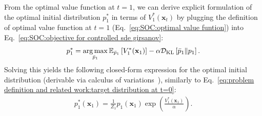 From the optimal value function at $t=1$, we can derive explicit formulation of the optimal initial distribution $p_1^*$ in terms of $V_1^*(\mathbf{x}_t)$ by plugging the definition of optimal value function at $t=1$ (Eq.~\ref{eq:SOC:optimal value funtion}) into Eq.~\ref{eq:SOC:objective for controlled sde girsanov}:
\begin{align}
    p_1^*=\operatorname*{arg\,max}_{\bar{p}_1} \mathbb{E}_{\bar{p}_1}\left[ V_1^*(\mathbf{x}_1) \right]-\alpha \mathcal{D}_{\text{KL}}\left[ 
\bar{p}_1 \| p_1 \right].
\end{align}
Solving this yields the following closed-form expression for the optimal initial distribution (derivable via calculus of variations~\cite{kim2025inference}), similarly to Eq.~\ref{eq:problem definition and related work:target distribution at t=0}:
\begin{align}
    \label{eq:SOC:optimal initial distribution}
    p_1^*(\mathbf{x}_1)=\frac{1}{Z_1}p_1(\mathbf{x}_1)\exp\left( \frac{V_1^*(\mathbf{x}_1)}{\alpha} \right).
\end{align}

